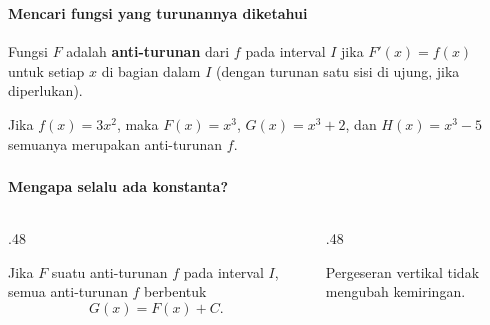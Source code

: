 \documentclass{../../kalkulus-ppt}
\begin{document}
\begin{frame}
\frametitle{\insertsection}
\framesubtitle{Mencari fungsi yang turunannya diketahui}

\begin{definisi}
Fungsi $F$ adalah \textbf{anti-turunan} dari $f$ pada interval $I$ jika $F'(x)=f(x)$ untuk setiap $x$ di bagian dalam $I$ (dengan turunan satu sisi di ujung, jika diperlukan).
\end{definisi}
\begin{contoh}
Jika $f(x)=3x^2$, maka $F(x)=x^3$, $G(x)=x^3+2$, dan $H(x)=x^3-5$ semuanya merupakan anti-turunan $f$.
\end{contoh}
\end{frame}

\begin{frame}
\frametitle{\insertsection}
\framesubtitle{Mengapa selalu ada konstanta?}
\begin{columns}[c]
\begin{column}{.48\textwidth}

\begin{teorema}
Jika $F$ suatu anti-turunan $f$ pada interval $I$, semua anti-turunan $f$ berbentuk
\[G(x)=F(x)+C.\]
\end{teorema}
\end{column}
\begin{column}{.48\textwidth}
\centering{}\par

\centering Pergeseran vertikal tidak mengubah kemiringan.
\end{column}
\end{columns}
\end{frame}
\end{document}
